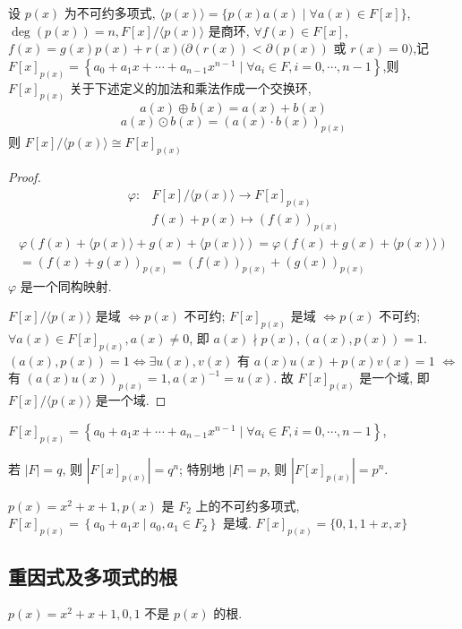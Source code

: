 设 $ p(x) $ 为不可约多项式, $ \langle p(x)\rangle=\{p(x) a(x) \mid \forall a(x) \in F[x]\} $, $ \operatorname{deg}(p(x))=n, F[x] /\langle p(x)\rangle $ 是商环, $ \forall f(x) \in F[x] $, $ f(x)=g(x) p(x)+r(x)(\partial(r(x))<\partial(p(x)) $ 或 $ r(x)=0) $,记 $ F[x]_{p(x)}=\left\{a_{0}+a_{1} x+\cdots+a_{n-1} x^{n-1} \mid \forall a_{i} \in F, i=0, \cdots, n-1\right\} $,则 $ F[x]_{p(x)} $ 关于下述定义的加法和乘法作成一个交换环, $$ a(x) \oplus b(x)=a(x)+b(x) $$
$$
a(x) \odot b(x)=(a(x) \cdot b(x))_{p(x)}
$$
则 $ F[x] /\langle p(x)\rangle \cong F[x]_{p(x)} $
\begin{proof}
    $$ \begin{aligned} \varphi: & F[x] /\langle p(x)\rangle \rightarrow F[x]_{p(x)} \\ & f(x)+p(x) \mapsto(f(x))_{p(x)}\end{aligned} $$
    $$
\begin{array}{c}
\varphi(f(x)+\langle p(x)\rangle+g(x)+\langle p(x)\rangle)=\varphi(f(x)+g(x)+\langle p(x)\rangle) \\
=(f(x)+g(x))_{p(x)}=(f(x))_{p(x)}+(g(x))_{p(x)}
\end{array}
$$
$ \varphi $ 是一个同构映射.

$ F[x] /\langle p(x)\rangle $ 是域 $ \Leftrightarrow p(x) $ 不可约;
$ F[x]_{p(x)} $ 是域 $ \Leftrightarrow p(x) $ 不可约;
$ \forall a(x) \in F[x]_{p(x)}, a(x) \neq 0 $, 即 $ a(x) \nmid p(x),(a(x), p(x))=1 $.
$ (a(x), p(x))=1 \Leftrightarrow \exists u(x), v(x) $ 有 $ a(x) u(x)+p(x) v(x)=1 $
$ \Leftrightarrow $ 有 $ (a(x) u(x))_{p(x)}=1, a(x)^{-1}=u(x) $.
故 $ F[x]_{p(x)} $ 是一个域, 即 $ F[x] /\langle p(x)\rangle $ 是一个域.
\end{proof}

$ F[x]_{p(x)}=\left\{a_{0}+a_{1} x+\cdots+a_{n-1} x^{n-1} \mid \forall a_{i} \in F, i=0, \cdots, n-1\right\} $,

若 $ |F|=q $, 则 $ \left|F[x]_{p(x)}\right|=q^{n} $; 特别地 $ |F|=p $, 则 $ \left|F[x]_{p(x)}\right|=p^{n} $.
\begin{example}
    $ p(x)=x^{2}+x+1, p(x) $ 是 $ F_{2} $ 上的不可约多项式, $ F[x]_{p(x)}=\left\{a_{0}+a_{1} x \mid a_{0}, a_{1} \in F_{2}\right\} $ 是域. $ F[x]_{p(x)}=\{0,1,1+x, x\} $
\end{example}

\subsection{重因式及多项式的根}
$ p(x)=x^{2}+x+1,0,1 $ 不是 $ p(x) $ 的根.

